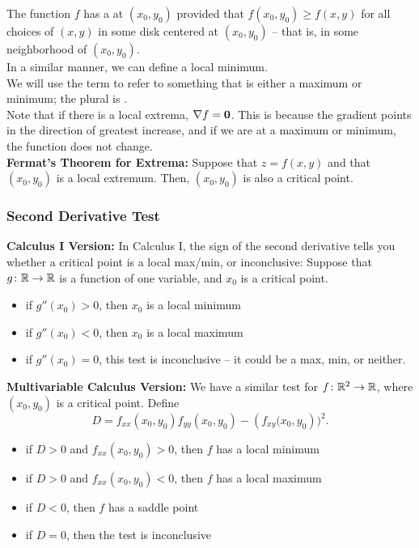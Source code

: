 The function \(f\) has a  at \((x_{0}, y_{0})\) provided that \(f(x_{0}, y_{0}) \geq f(x, y)\) for all choices of \((x, y)\) in some disk centered at \((x_{0}, y_{0})\) – that is, in some neighborhood of \((x_{0}, y_{0})\). \\

In a similar manner, we can define a local minimum. \\


We will use the term  to refer to something that is either a maximum or minimum; the plural is . \\

Note that if there is a local extrema, \(\nabla f = \mathbf{0}\). This is because the gradient points in the direction of greatest increase, and if we are at a maximum or minimum, the function does not change. \\

\textbf{Fermat's Theorem for Extrema:} Suppose that \(z = f(x, y)\) and that \((x_{0}, y_{0})\) is a local extremum. Then, \((x_{0}, y_{0})\) is also a critical point.

\subsubsection{Second Derivative Test}

\textbf{Calculus I Version:} In Calculus I, the sign of the second derivative tells you whether a critical point is a local max/min, or inconclusive: Suppose that \(g \colon \mathbb{R} \to \mathbb{R}\) is a function of one variable, and \(x_{0}\) is a critical point.

\begin{itemize}
    \item if \(g''(x_{0}) > 0\), then \(x_{0}\) is a local minimum
    \item if \(g''(x_{0}) < 0\), then \(x_{0}\) is a local maximum
    \item if \(g''(x_{0}) = 0\), this test is inconclusive – it could be a max, min, or neither.
\end{itemize}

\newpage

\textbf{Multivariable Calculus Version:} We have a similar test for \(f \colon \mathbb{R}^{2} \to \mathbb{R}\), where \((x_{0}, y_{0})\) is a critical point. Define
\[
D = f_{xx}(x_{0}, y_{0})f_{yy}(x_{0}, y_{0}) - (f_{xy}\bigl(x_{0}, y_{0})\bigr)^{2}.
\]

\begin{itemize}
    \item if \(D > 0\) and \(f_{xx}(x_{0}, y_{0}) > 0\), then \(f\) has a local minimum
    \item if \(D > 0\) and \(f_{xx}(x_{0}, y_{0}) < 0\), then \(f\) has a local maximum
    \item if \(D < 0\), then \(f\) has a saddle point
    \item if \(D = 0\), then the test is inconclusive
\end{itemize}

